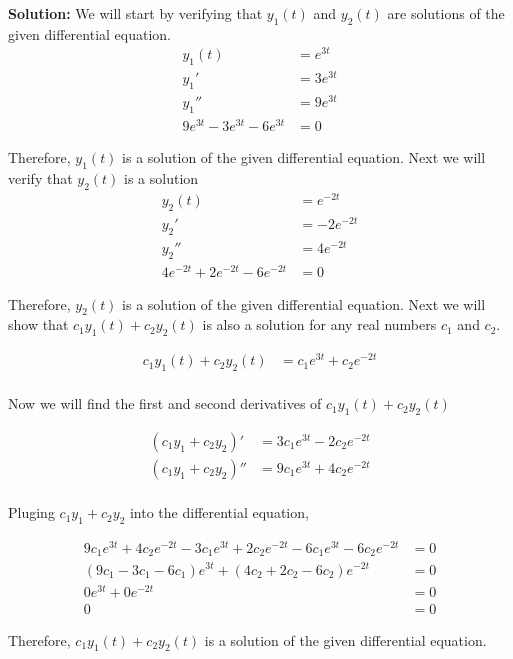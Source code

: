 \documentclass[12pt, letterpaper]{article}
\begin{document}
\textbf{Solution:} We will start by verifying that $y_1(t)$ and $y_2(t)$ are solutions of the given differential equation.
\begin{align*}
    y_1(t) &= e^{3t} \\
    y_1' &= 3e^{3t} \\
    y_1'' &= 9e^{3t} \\
    9e^{3t} - 3e^{3t} - 6e^{3t} &= 0
\end{align*}

Therefore, $y_1(t)$ is a solution of the given differential equation. Next we will verify that $y_2(t)$ is a solution
\begin{align*}
    y_2(t) &= e^{-2t} \\
    y_2' &= -2e^{-2t} \\
    y_2'' &= 4e^{-2t} \\
    4e^{-2t} + 2e^{-2t} - 6e^{-2t} &= 0
\end{align*}

Therefore, $y_2(t)$ is a solution of the given differential equation. Next we will show that $c_1y_1(t) + c_2y_2(t)$ is also a solution for any real numbers $c_1$ and $c_2$.

\begin{align*}
    c_1y_1(t) + c_2y_2(t) &= c_1e^{3t} + c_2e^{-2t} \\
\end{align*}

Now we will find the first and second derivatives of $c_1y_1(t) + c_2y_2(t)$

\begin{align*}
    (c_1y_1 + c_2y_2)' &= 3c_1e^{3t} - 2c_2e^{-2t} \\
    (c_1y_1 + c_2y_2)'' &= 9c_1e^{3t} + 4c_2e^{-2t} \\
\end{align*}

Pluging $c_1y_1 + c_2y_2$ into the differential equation,

\begin{align*}
    9c_1e^{3t} + 4c_2e^{-2t} - 3c_1e^{3t} + 2c_2e^{-2t} - 6c_1e^{3t} - 6c_2e^{-2t} &= 0 \\
    (9c_1 - 3c_1 - 6c_1)e^{3t} + (4c_2 + 2c_2 - 6c_2)e^{-2t} &= 0 \\
    0e^{3t} + 0e^{-2t} &= 0 \\
    0 &= 0
\end{align*}

Therefore, $c_1y_1(t) + c_2y_2(t)$ is a solution of the given differential equation.
\end{document}
